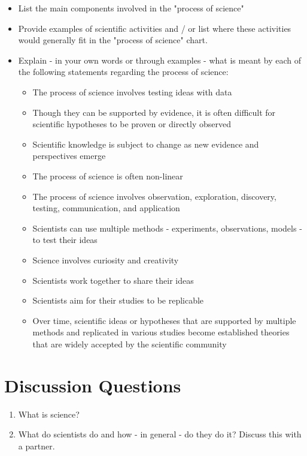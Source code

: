 \documentclass[
]{book}
\providecommand{\tightlist}{%
  \setlength{\itemsep}{0pt}\setlength{\parskip}{0pt}}
\begin{document}
\begin{itemize}
\tightlist
\item
  List the main components involved in the "process of science"
\item
  Provide examples of scientific activities and / or list where these activities would generally fit in the "process of science" chart.
\item
  Explain - in your own words or through examples - what is meant by each of the following statements regarding the process of science:

  \begin{itemize}
  \tightlist
  \item
    The process of science involves testing ideas with data
  \item
    Though they can be supported by evidence, it is often difficult for scientific hypotheses to be proven or directly observed
  \item
    Scientific knowledge is subject to change as new evidence and perspectives emerge
  \item
    The process of science is often non-linear
  \item
    The process of science involves observation, exploration, discovery, testing, communication, and application
  \item
    Scientists can use multiple methods - experiments, observations, models - to test their ideas
  \item
    Science involves curiosity and creativity
  \item
    Scientists work together to share their ideas
  \item
    Scientists aim for their studies to be replicable
  \item
    Over time, scientific ideas or hypotheses that are supported by multiple methods and replicated in various studies become established theories that are widely accepted by the scientific community
  \end{itemize}
\end{itemize}

\hypertarget{discussion-questions}{%
\section*{Discussion Questions}\label{discussion-questions}}

\begin{enumerate}
\def\labelenumi{\arabic{enumi}.}
\tightlist
\item
  What is science?
\item
  What do scientists do and how - in general - do they do it? Discuss this with a partner.
\end{enumerate}
\end{document}
